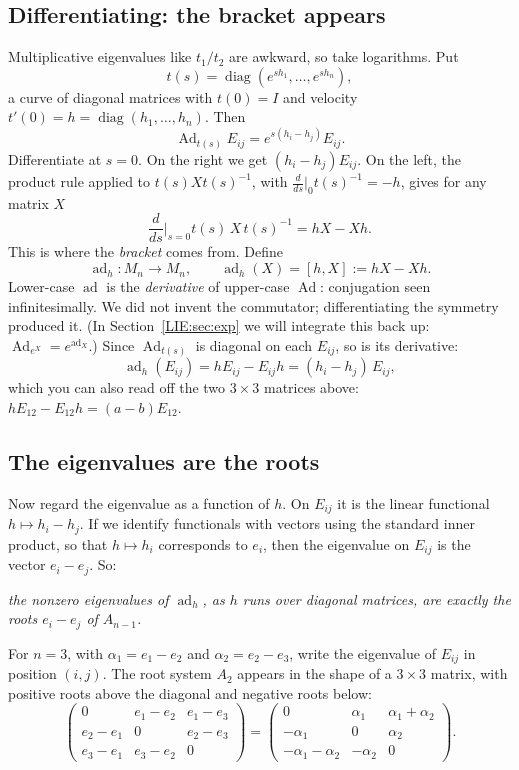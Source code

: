 \documentclass[11pt,openany]{book}
\theoremstyle{plain}
\theoremstyle{definition}
\theoremstyle{remark}
\begin{document}
\subsection*{Differentiating: the bracket appears}
Multiplicative eigenvalues like $t_1/t_2$ are awkward, so take logarithms. Put
\[
  t(s)=\operatorname{diag}(e^{sh_1},\dots,e^{sh_n}),
\]
a curve of diagonal matrices with $t(0)=I$ and velocity $t'(0)=h=\operatorname{diag}(h_1,\dots,h_n)$. Then
\[
  \operatorname{Ad}_{t(s)}E_{ij}=e^{s(h_i-h_j)}E_{ij}.
\]
Differentiate at $s=0$. On the right we get $(h_i-h_j)E_{ij}$. On the left, the product rule applied
to $t(s)Xt(s)^{-1}$, with $\frac{d}{ds}\big|_0t(s)^{-1}=-h$, gives for any matrix $X$
\[
  \frac{d}{ds}\Big|_{s=0}t(s)\,X\,t(s)^{-1}=hX-Xh .
\]
This is where the \emph{bracket} comes from. Define
\[
  \operatorname{ad}_h\colon M_n\to M_n,\qquad \operatorname{ad}_h(X)=[h,X]:=hX-Xh .
\]
Lower-case $\operatorname{ad}$ is the \emph{derivative} of upper-case $\operatorname{Ad}$: conjugation
seen infinitesimally. We did not invent the commutator; differentiating the symmetry produced it. (In
Section~\ref{LIE:sec:exp} we will integrate this back up: $\operatorname{Ad}_{e^X}=e^{\operatorname{ad}_X}$.)
Since $\operatorname{Ad}_{t(s)}$ is diagonal on each $E_{ij}$, so is its derivative:
\[
  \operatorname{ad}_h(E_{ij})=hE_{ij}-E_{ij}h=(h_i-h_j)\,E_{ij},
\]
which you can also read off the two $3\times3$ matrices above: $hE_{12}-E_{12}h=(a-b)E_{12}$.

\subsection*{The eigenvalues are the roots}
Now regard the eigenvalue as a function of $h$. On $E_{ij}$ it is the linear functional
$h\mapsto h_i-h_j$. If we identify functionals with vectors using the standard inner product, so that
$h\mapsto h_i$ corresponds to $e_i$, then the eigenvalue on $E_{ij}$ is the vector $e_i-e_j$. So:
\begin{center}
\emph{the nonzero eigenvalues of $\operatorname{ad}_h$, as $h$ runs over diagonal matrices, are exactly
the roots $e_i-e_j$ of $A_{n-1}$.}
\end{center}
For $n=3$, with $\alpha_1=e_1-e_2$ and $\alpha_2=e_2-e_3$, write the eigenvalue of $E_{ij}$ in position
$(i,j)$. The root system $A_2$ appears in the shape of a $3\times 3$ matrix, with positive roots above the
diagonal and negative roots below:
\[
  \begin{pmatrix}0&e_1-e_2&e_1-e_3\\ e_2-e_1&0&e_2-e_3\\ e_3-e_1&e_3-e_2&0\end{pmatrix}
  =\begin{pmatrix}0&\alpha_1&\alpha_1+\alpha_2\\ -\alpha_1&0&\alpha_2\\ -\alpha_1-\alpha_2&-\alpha_2&0\end{pmatrix}.
\]
\end{document}
